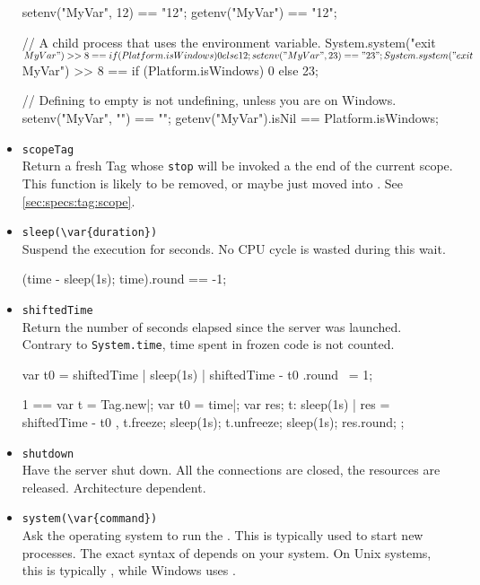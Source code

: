 \begin{itemize}
\begin{urbiassert}[firstnumber=last]
setenv("MyVar", 12) == "12";
getenv("MyVar") == "12";

// A child process that uses the environment variable.
System.system("exit $MyVar") >> 8 ==
       {if (Platform.isWindows) 0 else 12};
setenv("MyVar", 23) == "23";
System.system("exit $MyVar") >> 8 ==
       {if (Platform.isWindows) 0 else 23};

// Defining to empty is not undefining, unless you are on Windows.
setenv("MyVar", "") == "";
getenv("MyVar").isNil == Platform.isWindows;
\end{urbiassert}

\item \lstinline|scopeTag|\\
  Return a fresh Tag whose \lstinline|stop| will be invoked a the end
  of the current scope.  This function is likely to be removed, or
  maybe just moved into .  See
  \autoref{sec:specs:tag:scope}.

\item \lstinline|sleep(\var{duration})|\\
  Suspend the execution for  seconds.  No CPU cycle is
  wasted during this wait.

\begin{urbiassert}[firstnumber=last]
(time - {sleep(1s); time}).round == -1;
\end{urbiassert}

\item \lstinline|shiftedTime|\\
  Return the number of seconds elapsed since the \urbi server was
  launched.  Contrary to \lstinline|System.time|, time spent in frozen
  code is not counted.
\begin{urbiassert}[firstnumber=last]
{ var t0 = shiftedTime | sleep(1s) | shiftedTime - t0 }.round ~= 1;

  1 ==
  {
    var t = Tag.new|;
    var t0 = time|;
    var res;
    t: { sleep(1s) | res = shiftedTime - t0 },
    t.freeze;
    sleep(1s);
    t.unfreeze;
    sleep(1s);
    res.round;
  };
\end{urbiassert}

\item \lstinline|shutdown|\\
  Have the \urbi server shut down.  All the connections are closed,
  the resources are released.  Architecture dependent.

\item \lstinline|system(\var{command})|\\
  Ask the operating system to run the .  This is
  typically used to start new processes.  The exact syntax of
   depends on your system.  On Unix systems, this is
  typically , while Windows uses .


\end{itemize}
